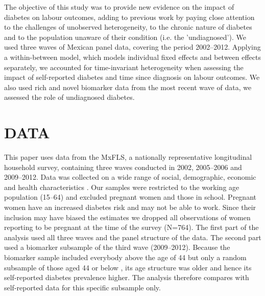 \documentclass[10pt,letterpaper]{article}
\begin{document}
The objective of this study was to provide new evidence on the impact of diabetes on labour outcomes, adding to previous work by paying close attention to the challenges of unobserved heterogeneity, to the chronic nature of diabetes and to the population unaware of their condition (i.e. the 'undiagnosed'). We used three waves of Mexican panel data, covering the period 2002--2012. Applying a within-between model, which  models individual fixed effects and between effects separately, we accounted for time-invariant heterogeneity when assessing the impact of self-reported diabetes and time since diagnosis on labour outcomes. We also used rich and novel biomarker data from the most recent wave of data, we assessed the role of undiagnosed diabetes.

\section*{\label{sec:Data}DATA}

This paper uses data from the \acf{MxFLS}, a nationally representative longitudinal household survey, containing three waves conducted in 2002, 2005--2006 and 2009--2012. Data was collected on a wide range of social, demographic, economic and health characteristics \cite{Rubalcava2013}. Our samples were restricted to the working age population (15--64) and excluded pregnant women and those in school. Pregnant women have an increased diabetes risk and may not be able to work. Since their inclusion may have biased the estimates we dropped all observations of women reporting to be pregnant at the time of the survey (N=764). The first part of the analysis used all three waves and the panel structure of the data. The second part used a biomarker subsample of the third wave (2009--2012). Because the biomarker sample included everybody above the age of 44 but only a random subsample of those aged 44 or below \cite{Crimmins2015}, its age structure was older and hence its self-reported diabetes prevalence higher. The analysis therefore compares with self-reported data for this specific subsample only.
\end{document}
